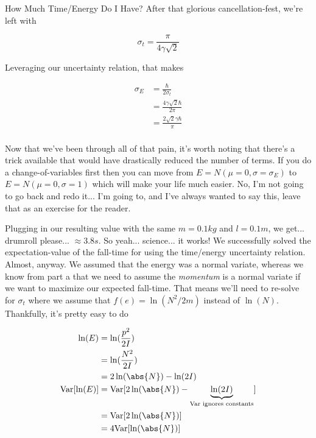 \begin{answer}
\begin{answerpart}{How Much Time/Energy Do I Have?}
    After that glorious cancellation-fest, we're left with

    \begin{equation}
      \sigma_t = \frac{\pi}{4\gamma\sqrt{2}}
    \end{equation}

    Leveraging our uncertainty relation, that makes

    \begin{equation}
      \begin{split}
        \sigma_E
        &= \frac{\hbar}{2\sigma_t}\\
        &= \frac{4\gamma\sqrt{2}\hbar}{2\pi}\\
        &= \frac{2\sqrt{2}\gamma\hbar}{\pi}\\
      \end{split}
    \end{equation}

    Now that we've been through all of that pain, it's worth noting
    that there's a trick available that would have drastically reduced
    the number of terms.  If you do a change-of-variables first then
    you can move from $E = N(\mu=0, \sigma=\sigma_E)$ to $E = N(\mu=0,
    \sigma=1)$ which will make your life much easier.  No, I'm not
    going to go back and redo it... I'm going to, and I've always
    wanted to say this, leave that as an exercise for the reader.

    Plugging in our resulting value with the same $m=0.1kg$ and
    $l=0.1m$, we get... drumroll please... $\approx 3.8s$.  So
    yeah... science... it works!  We successfully solved the
    expectation-value of the fall-time for \icepick{} using the
    time/energy uncertainty relation.  Almost, anyway.  We assumed
    that the energy was a normal variate, whereas we know from part a
    that we need to assume the \emph{momentum} is a normal variate if
    we want to maximize our expected fall-time.  That means we'll need
    to re-solve for $\sigma_t$ where we assume that $f(e) =
    \ln(N^2/2m)$ instead of $\ln(N)$.  Thankfully, it's pretty easy to
    do

    \begin{equation}
      \begin{alignedat}{2}
        &&\ln(E)
        &= \ln(\frac{p^2}{2I})\\
        &&&= \ln(\frac{N^2}{2I})\\
        &&&= 2\ln(\abs{N}) - \ln(2I)\\
        && \mathrm{Var}[\ln(E)]
        &= \mathrm{Var}[2\ln(\abs{N}) - \underbrace{\ln(2I)}_{\text{Var ignores constants}}]\\
        &&&= \mathrm{Var}[2\ln(\abs{N})]\\
        &&&= 4\mathrm{Var}[\ln(\abs{N})]\\
      \end{alignedat}
    \end{equation}


\end{answerpart}
\end{answer}
